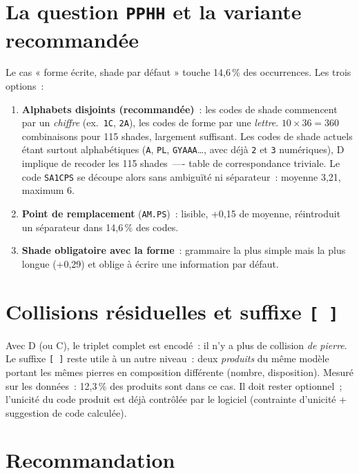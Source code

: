 \documentclass[11pt,a4paper]{article}
\newcommand{\code}[1]{\texttt{#1}}
\begin{document}
\section{La question \code{PPHH} et la variante recommandée}

Le cas « forme écrite, shade par défaut » touche 14,6\,\% des
occurrences. Les trois options~:

\begin{enumerate}
\item \textbf{Alphabets disjoints (recommandée)}~: les codes de shade
  commencent par un \emph{chiffre} (ex.~\code{1C}, \code{2A}), les codes de
  forme par une \emph{lettre}. $10 \times 36 = 360$ combinaisons pour 115
  shades, largement suffisant. Les codes de shade actuels \'etant
  surtout alphab\'etiques (\code{A}, \code{PL}, \code{GYAAA}\ldots, avec
  d\'ej\`a \code{2} et \code{3} num\'eriques), D implique de recoder les 115
  shades~—- table de correspondance triviale. Le code \code{SA1CPS} se découpe alors sans
  ambiguïté ni séparateur~: moyenne 3,21, maximum 6.
\item \textbf{Point de remplacement} (\code{AM.PS})~: lisible, +0,15 de
  moyenne, réintroduit un séparateur dans 14,6\,\% des codes.
\item \textbf{Shade obligatoire avec la forme}~: grammaire la plus simple
  mais la plus longue (+0,29) et oblige à écrire une information par
  défaut.
\end{enumerate}

\section{Collisions résiduelles et suffixe \code{[\,]}}
\label{sec:collisions}

Avec D (ou C), le triplet complet est encodé~: il n'y a plus de collision
\emph{de pierre}. Le suffixe \code{[\,]} reste utile à un autre niveau~: deux
\emph{produits} du même modèle portant les mêmes pierres en composition
différente (nombre, disposition). Mesuré sur les données~: 12,3\,\% des produits sont dans ce cas. Il doit rester optionnel~;
l'unicité du code produit est déjà contrôlée par le logiciel (contrainte
d'unicité + suggestion de code calculée).

\section{Recommandation}
\end{document}
